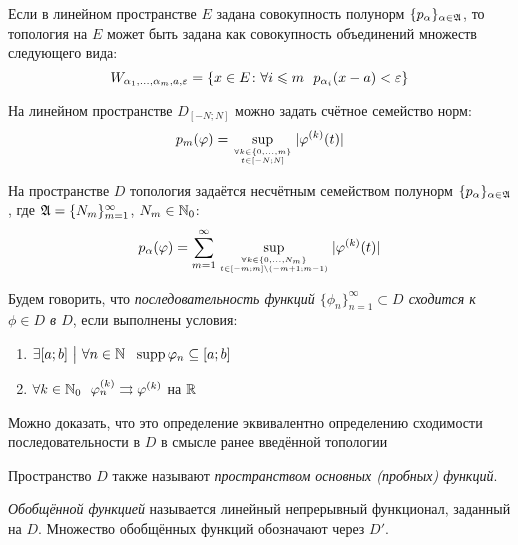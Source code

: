 \begin{proposition}
	Если в линейном пространстве $E$ задана совокупность полунорм $\{p_\alpha\}_{\alpha \in \mathfrak{A}}$, то топология на $E$ может быть задана как совокупность объединений множеств следующего вида:
	\[
		W_{\alpha_1, \ldots, \alpha_m, a, \varepsilon} = \{x \in E \colon \forall i \leqslant m\ \ p_{\alpha_i}(x - a) < \varepsilon\}
	\]
\end{proposition}

\begin{proposition}
	На линейном пространстве $D_{[-N; N]}$ можно задать счётное семейство норм:
	\[
		p_m(\varphi) = \sup_{\forall k \in \{0, \ldots, m\} \atop {t \in [-N; N]}} |\varphi^{(k)}(t)|
	\]
\end{proposition}

\begin{proposition}
	На пространстве $D$ топология задаётся несчётным семейством полунорм $\{p_\alpha\}_{\alpha \in \mathfrak{A}}$, где $\mathfrak{A} = \{N_m\}_{m = 1}^\infty$, $N_m \in \mathbb{N}_0$:
	\[
		p_{\alpha}(\varphi) = \sum_{m = 1}^\infty \sup_{\forall k \in \{0, \ldots, N_m\} \atop {t \in [-m; m] \backslash(-m + 1; m - 1)}} |\varphi^{(k)}(t)|
	\]
\end{proposition}

\begin{definition}
	Будем говорить, что \textit{последовательность функций $\{\phi_n\}_{n = 1}^\infty \subset D$ сходится к $\phi \in D$ в $D$}, если выполнены условия:
	\begin{enumerate}
		\item $\exists [a; b] \such \forall n \in \N\ \ \supp \phi_n \subseteq [a; b]$
		
		\item $\forall k \in \mathbb{N}_0\ \ \varphi_n^{(k)} \rightrightarrows \varphi^{(k)}$ на $\mathbb{R}$
	\end{enumerate}
\end{definition}

\begin{note}
	Можно доказать, что это определение эквивалентно определению сходимости последовательности в $D$ в смысле ранее введённой топологии
\end{note}

\begin{note}
	Пространство $D$ также называют \textit{пространством основных (пробных) функций}.
\end{note}

\begin{definition}
	\textit{Обобщённой функцией} называется линейный непрерывный функционал, заданный на $D$. Множество обобщённых функций обозначают через $D'$.
\end{definition}

